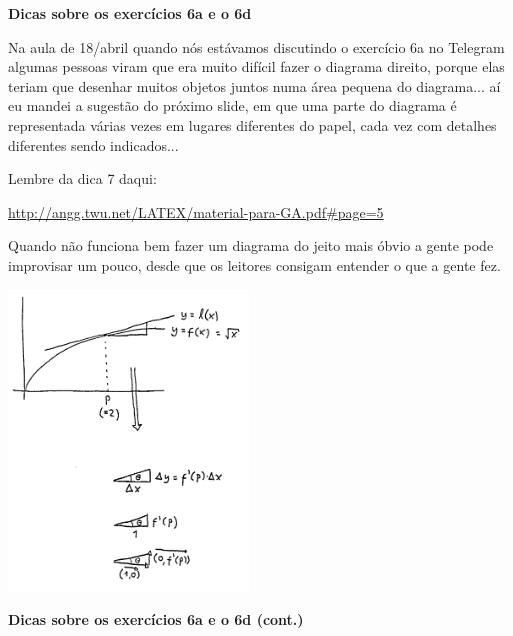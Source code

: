 \documentclass[oneside,12pt]{article}
\begin{document}

{\bf Dicas sobre os exercícios 6a e o 6d}

Na aula de 18/abril quando nós estávamos discutindo o exercício 6a no
Telegram algumas pessoas viram que era muito difícil fazer o diagrama
direito, porque elas teriam que desenhar muitos objetos juntos numa
área pequena do diagrama... aí eu mandei a sugestão do próximo slide,
em que uma parte do diagrama é representada várias vezes em lugares
diferentes do papel, cada vez com detalhes diferentes sendo
indicados...

Lembre da dica 7 daqui:


{\footnotesize

\url{http://angg.twu.net/LATEX/material-para-GA.pdf\#page=5}

}

\ssk

Quando não funciona bem fazer um diagrama do jeito mais óbvio a gente
pode improvisar um pouco, desde que os leitores consigam entender o
que a gente fez.



\newpage

\includegraphics[height=8cm]{2020-2-C3/20210428_C3_6a.pdf}


\newpage


{\bf Dicas sobre os exercícios 6a e o 6d (cont.)}
\end{document}
